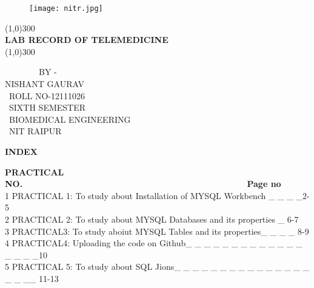 \documentclass[a4paper,0pt]{article}
\begin{document}
\begin{titlepage}
\begin{figure}[h!]
  \centering
\texttt{[image: nitr.jpg]}
\end{figure}
\begin{center}
\line(1,0){300}\\
\huge{\bfseries LAB RECORD OF TELEMEDICINE}\\[2mm]
\line(1,0){300}\\[1cm]
\end{center}
\begin{center}
\textnormal{  \ \ \ \ \ \ \ \ BY -}\\ \LARGE NISHANT GAURAV\\
\  ROLL NO-12111026 \\
\ SIXTH SEMESTER \\
\  BIOMEDICAL ENGINEERING \\
\ NIT RAIPUR\\
\end{center}
\end{titlepage}
\begin{center}
\textbf{\LARGE INDEX}\\[2CM]
\end{center}
\begin {flushleft} 
\textbf{\large  PRACTICAL NO.\ \ \ \ \  \ \ \ \ \ \ \ \ \ \ \ \ \ \  \ \ \ \ \ \ \ \ \ \ \ \ \ \ \ \ \ \ \ \ \ \ \ \  \ \ \  Page no}\\[1cm]
\normalsize 1 PRACTICAL 1:  To study about Installation of MYSQL Workbench \_ \_ \_ \_2-5\\[0.75cm]
\normalsize 2 PRACTICAL 2: To study about MYSQL Databases and its properties \_  6-7 \\[0.75cm]
\normalsize 3 PRACTICAL3: To study aboiut MYSQL Tables and its properties\_ \_ \_ \_ 8-9\\[0.75cm]
\normalsize 4 PRACTICAL4: Uploading the code on Github\_ \_ \_ \_ \_ \_ \_ \_ \_ \_ \_ \_ \_ \_ \_ \_ \_10\\[0.75cm]
\normalsize 5 PRACTICAL 5: To study about SQL Jions\_ \_ \_ \_ \_ \_ \_ \_ \_ \_ \_ \_ \_ \_ \_ \_ \_ \_\_ 11-13\\[0.75cm]
\end{flushleft}
\newpage
\end{document}
